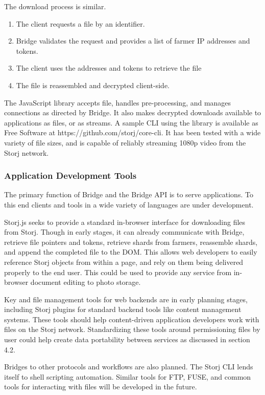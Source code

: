 \documentclass[a4paper,10pt]{article}
\begin{document}
The download process is similar.

\begin{enumerate}
\item The client requests a file by an identifier.
\item Bridge validates the request and provides a list of farmer IP addresses and tokens.
\item The client uses the addresses and tokens to retrieve the file
\item The file is reassembled and decrypted client-side.
\end{enumerate}

The JavaScript library accepts file, handles pre-processing, and manages connections as directed by Bridge. It also makes decrypted downloads available to applications as files, or as streams. A sample CLI using the library is available as Free Software at https://github.com/storj/core-cli. It has been tested with a wide variety of file sizes, and is capable of reliably streaming 1080p video from the Storj network.

\subsubsection{Application Development Tools}
The primary function of Bridge and the Bridge API is to serve applications. To this end clients and tools in a wide variety of languages are under development.

Storj.js\cite{28} seeks to provide a standard in-browser interface for downloading files from Storj. Though in early stages, it can already communicate with Bridge, retrieve file pointers and tokens, retrieve shards from farmers, reassemble shards, and append the completed file to the DOM. This allows web developers to easily reference Storj objects from within a page, and rely on them being delivered properly to the end user. This could be used to provide any service from in-browser document editing to photo storage.

Key and file management tools for web backends are in early planning stages, including Storj plugins for standard backend tools like content management systems. These tools should help content-driven application developers work with files on the Storj network. Standardizing these tools around permissioning files by user could help create data portability between services as discussed in section 4.2.

Bridges to other protocols and workflows are also planned. The Storj CLI lends itself to shell scripting automation. Similar tools for FTP, FUSE, and common tools for interacting with files will be developed in the future.
\end{document}
